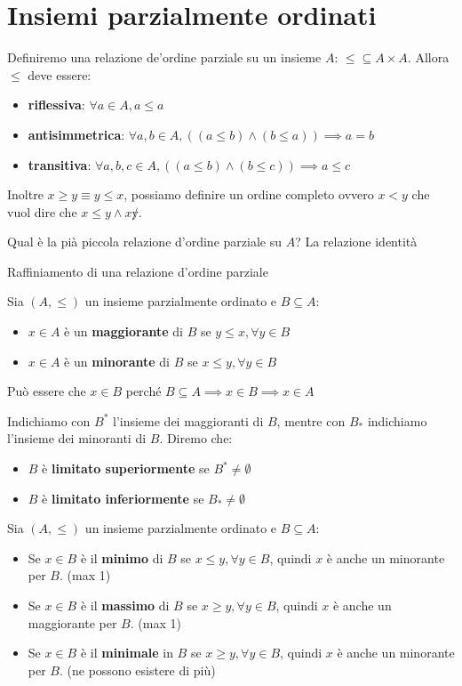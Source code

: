 \section{Insiemi parzialmente ordinati}
\begin{definizione}
    Definiremo una relazione de'ordine parziale su un insieme $A$: $\le\subseteq A\times A$.
    Allora $\le$ deve essere:
    \begin{itemize}
        \item \textbf{riflessiva}: $\forall a\in A, a\le a$
        \item \textbf{antisimmetrica}: $\forall a,b\in A, ((a\le b) \land (b\le a)) \implies a=b$
        \item \textbf{transitiva}: $\forall a,b,c\in A, ((a\le b) \land (b\le c)) \implies a\le c$
    \end{itemize}
\end{definizione}
Inoltre $x\ge y \equiv y\le x$, possiamo definire un ordine completo ovvero $x<y$
che vuol dire che $x\le y\land x\not y$.

Qual è la pià piccola relazione d'ordine parziale su $A$? La relazione identità

Raffiniamento di una relazione d'ordine parziale

\begin{definizione}
    Sia $(A,\le)$ un insieme parzialmente ordinato e $B\subseteq A$:
    \begin{itemize}
        \item $x\in A$ è un \textbf{maggiorante} di $B$ se $y\le x,\forall y\in B$
        \item $x\in A$ è un \textbf{minorante} di $B$ se $x\le y,\forall y\in B$
    \end{itemize}
    Può essere che $x\in B$ perché $B\subseteq A\implies x\in B\implies x\in A$
\end{definizione}
Indichiamo con $B^\ast$ l'insieme dei maggioranti di $B$, mentre con $B_\ast$ 
indichiamo l'insieme dei minoranti di $B$. Diremo che:
\begin{itemize}
    \item $B$ è \textbf{limitato superiormente} se $B^\ast \ne \emptyset$
    \item $B$ è \textbf{limitato inferiormente} se $B_\ast \ne \emptyset$
\end{itemize}
\begin{definizione}
    Sia $(A,\le)$ un insieme parzialmente ordinato e $B\subseteq A$:
    \begin{itemize}
        \item Se $x\in B$ è il \textbf{minimo} di $B$ se $x\le y,\forall y\in B$, quindi $x$ è
        anche un minorante per $B$. (max 1)
        \item Se $x\in B$ è il \textbf{massimo} di $B$ se $x\ge y,\forall y\in B$, quindi $x$ è
        anche un maggiorante per $B$. (max 1)
        \item Se $x\in B$ è il \textbf{minimale} in $B$ se $x\ge y,\forall y\in B$, quindi $x$ è
        anche un minorante per $B$. (ne possono esistere di più)
    \end{itemize}      
\end{definizione}

